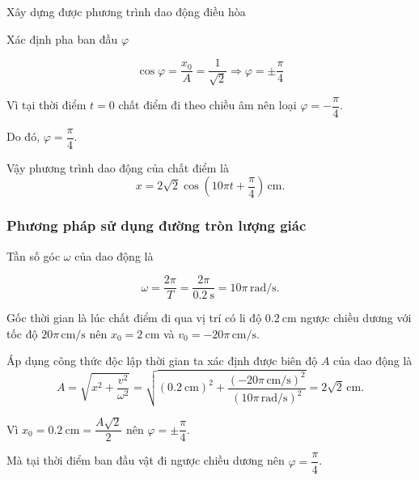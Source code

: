 \begin{dang}{Xây dựng được phương trình dao động điều hòa}
{		Xác định pha ban đầu $\varphi$
		
		\begin{equation*}
			\cos\varphi =\dfrac{x_{0}}{A}=\frac{1}{\sqrt{2}}\Rightarrow\varphi =\pm\dfrac{\pi }{4}
		\end{equation*}
		
		Vì tại thời điểm $t=0$ chất điểm đi theo chiều âm nên loại $\varphi =-\dfrac{\pi }{4}$.
		
		Do đó, $\varphi =\dfrac{\pi }{4}$.
		
		Vậy phương trình dao động của chất điểm là
		\begin{equation*}
			x=2\sqrt{2}\cos\left(10\pi t+\dfrac{\pi }{4} \right)\,\text{cm}.
		\end{equation*}
		
		\subsubsection{Phương pháp sử dụng đường tròn lượng giác}
		
		Tần số góc $\omega$ của dao động là
		
		\begin{equation*}
			\omega =\frac{2\pi }{T}=\frac{2\pi }{\SI{0,2}{\second}}=10\pi \,\text{rad/s}.
		\end{equation*}
		
		Gốc thời gian là lúc chất điểm đi qua vị trí có li độ $\SI{0,2}{\centi\meter}$ ngược chiều dương với tốc độ $20\pi\, \text{cm/s}$ nên $x_0=\SI{2}{\centi\meter}$ và $v_0=-20\pi\, \text{cm/s}$.
		
		Áp dụng công thức độc lập thời gian ta xác định được biên độ $A$ của dao động là
		\begin{equation*}
			A=\sqrt{x^2+\dfrac{v^2}{\omega ^2}}=\sqrt{(\SI{0,2}{\centi\meter})^2+\dfrac{(-20\pi\, \text{cm/s} )^2}{(10\pi \,\text{rad/s} )^2}}=2\sqrt{2}\,\text{cm}.
		\end{equation*}
		
		Vì $x_0=\SI{0,2}{\centi\meter}=\dfrac{A\sqrt{2}}{2}$ nên $\varphi =\pm\dfrac{\pi }{4}$.
		
		Mà tại thời điểm ban đầu vật đi ngược chiều dương nên $\varphi =\dfrac{\pi }{4}$.
		
}
\end{dang}
